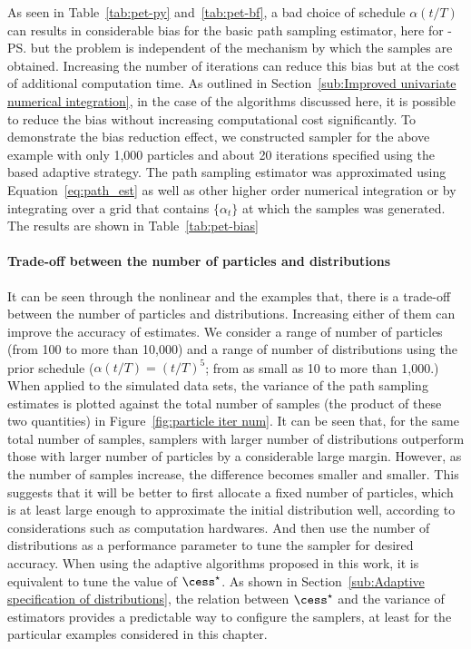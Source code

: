 As seen in Table~\ref{tab:pet-py} and~\ref{tab:pet-bf}, a bad choice of
schedule $\alpha(t/T)$ can results in considerable bias for the basic path
sampling estimator, here for \smc[2]-\ps but the problem is independent of the
mechanism by which the samples are obtained. Increasing the number of
iterations can reduce this bias but at the cost of additional computation
time. As outlined in Section~\ref{sub:Improved univariate numerical
  integration}, in the case of the \smc algorithms discussed here, it is
possible to reduce the bias without increasing computational cost
significantly. To demonstrate the bias reduction effect, we constructed \smc
sampler for the above \pet example with only 1,000 particles and about 20
iterations specified using the \cess based adaptive strategy. The path
sampling estimator was approximated using Equation~\eqref{eq:path_est} as well
as other higher order numerical integration or by integrating over a grid that
contains $\{\alpha_t\}$ at which the samples was generated. The results are
shown in Table~\ref{tab:pet-bias}



\paragraph{Trade-off between the number of particles and distributions}



It can be seen through the nonlinear \ode and the \pet examples that, there
is a trade-off between the number of particles and distributions. Increasing
either of them can improve the accuracy of estimates. We consider a range of
number of particles (from 100 to more than 10,000) and a range of number of
distributions using the prior schedule ($\alpha(t/T) = (t/T)^5$; from as
small as 10 to more than 1,000.) When applied to the simulated data sets, the
variance of the path sampling estimates is plotted against the total number
of samples (the product of these two quantities) in Figure~\ref{fig:particle
iter num}. It can be seen that, for the same total number of samples,
samplers with larger number of distributions outperform those with larger
number of particles by a considerable large margin. However, as the number of
samples increase, the difference becomes smaller and smaller. This suggests
that it will be better to first allocate a fixed number of particles, which
is at least large enough to approximate the initial distribution well,
according to considerations such as computation hardwares. And then use the
number of distributions as a performance parameter to tune the sampler for
desired accuracy. When using the adaptive algorithms proposed in this work,
it is equivalent to tune the value of $\cess^\star$. As shown in
Section~\ref{sub:Adaptive specification of distributions}, the relation
between $\cess^\star$ and the variance of estimators provides a predictable
way to configure the samplers, at least for the particular examples
considered in this chapter.

